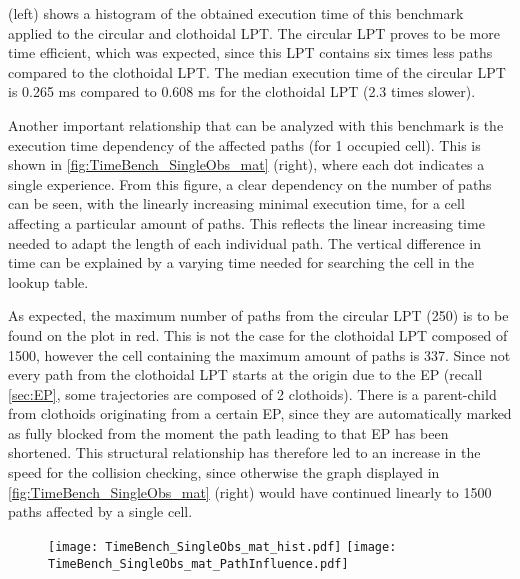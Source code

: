  (left) shows a histogram of the obtained execution time of this benchmark applied to the circular and clothoidal LPT. The circular LPT proves to be more time efficient, which was expected, since this LPT contains six times less paths compared to the clothoidal LPT. The median execution time of the circular LPT is 0.265 ms compared to 0.608 ms for the clothoidal LPT (2.3 times slower). 


Another important relationship that can be analyzed with this benchmark is the execution time dependency of the affected paths (for 1 occupied cell). This is shown in \cref{fig:TimeBench_SingleObs_mat} (right), where each dot indicates a single experience. From this figure, a clear dependency on the number of paths can be seen, with the linearly increasing minimal execution time, for a cell affecting a particular amount of paths. This reflects the linear increasing time needed to adapt the length of each individual path. The vertical difference in time can be explained by a varying time needed for searching the cell in the lookup table.

As expected, the maximum number of paths from the circular LPT (250) is to be found on the plot in red. This is not the case for the clothoidal LPT composed of 1500, however the cell containing the maximum amount of paths is 337. Since not every path from the clothoidal LPT starts at the origin due to the EP (recall \cref{sec:EP}, some trajectories are composed of 2 clothoids). There is a parent-child from clothoids originating from a certain EP, since they are automatically marked as fully blocked from the moment the path leading to that EP has been shortened. This structural relationship has therefore led to an increase in the speed for the collision checking, since otherwise the graph displayed in \cref{fig:TimeBench_SingleObs_mat} (right) would have continued linearly to 1500 paths affected by a single cell. 

\begin{figure}[!htbp]
	\centering
	\texttt{[image: TimeBench\_SingleObs\_mat\_hist.pdf]}
    \hfill
	\texttt{[image: TimeBench\_SingleObs\_mat\_PathInfluence.pdf]}
\end{figure}

